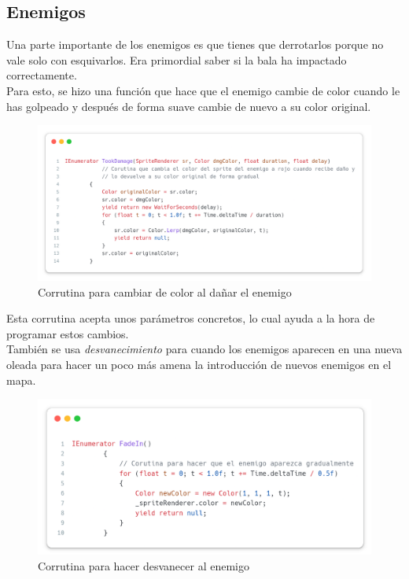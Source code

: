 \documentclass[11pt]{article}
\begin{document}
    \subsection{Enemigos} \label{fig:enemigos}
        Una parte importante de los enemigos es que tienes que derrotarlos porque no vale solo con esquivarlos. Era primordial saber si la bala ha impactado correctamente. \\
        Para esto, se hizo una función que hace que el enemigo cambie de color cuando le has golpeado y después de forma suave cambie de nuevo a su color original. \\
        \begin{figure}[H]
            \centering
            \includegraphics[width=\textwidth]{Images/Menuprincipal/TookDamage.png}
            \caption{Corrutina para cambiar de color al dañar el enemigo}
        \end{figure}
        Esta corrutina acepta unos parámetros concretos, lo cual ayuda a la hora de programar estos cambios.\\

        También se usa \textit{desvanecimiento} para cuando los enemigos aparecen en una nueva oleada para hacer un poco más amena la introducción de nuevos enemigos en el mapa.
        \begin{figure}[H]
            \centering
            \includegraphics[width=\textwidth]{Images/Menuprincipal/fadein.png}
            \caption{Corrutina para hacer desvanecer al enemigo}
        \end{figure}
\end{document}
